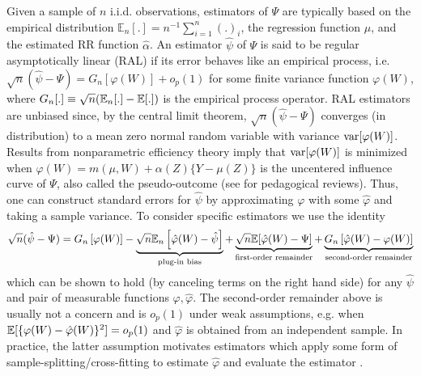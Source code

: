 Given a sample of $n$ i.i.d. observations, estimators of $\Psi$ are typically based on the empirical distribution $\mathbb{E}_n[.] = n^{-1}\sum_{i=1}^n (.)_i$, the regression function $\hat{\mu}$, and the estimated RR function $\hat{\alpha}$. An estimator $\hat{\psi}$ of $\Psi$ is said to be regular asymptotically linear (RAL) if its error behaves like an empirical process, i.e. $\sqrt{n}(\hat{\psi} - \Psi)= G_n[\varphi(W)] + o_p(1)$ for some finite variance function $\varphi(W)$, where $G_n[.] \equiv \sqrt{n} (\mathbb{E}_n[.]- \mathbb{E}[.])$ is the empirical process operator. RAL estimators are unbiased since, by the central limit theorem, $\sqrt{n}(\hat{\psi} - \Psi)$ converges (in distribution) to a mean zero normal random variable with variance $\mathrm{var}[\varphi(W)]$. Results from nonparametric efficiency theory \citep{Newey1994} imply that $\mathrm{var}[\varphi(W)]$ is minimized when $\varphi(W) = m(\mu, W) + \alpha(Z)\{Y - \mu(Z)\}$ is the uncentered influence curve \citep{Hampel1974,Ichimura2022} of $\Psi$, also called the pseudo-outcome \citep{Kennedy2020, Hines2023b} (see \cite{Hines2022, Kennedy2022} for pedagogical reviews). Thus, one can construct standard errors for $\hat{\psi}$ by approximating $\varphi$ with some $\hat{\varphi}$ and taking a sample variance. To consider specific estimators we use the identity
\begin{align}
    \sqrt{n}(\hat{\psi} - \Psi) = G_n \left[\varphi(W) \right] - \underbrace{\sqrt{n}\mathbb{E}_n \left[\hat{\varphi}(W) - \hat{\psi} \right]}_{\text{plug-in bias}} + \underbrace{\sqrt{n}\mathbb{E}[\hat{\varphi}(W) - \Psi]}_{\text{first-order remainder}} +  \underbrace{ G_n \left[\hat{\varphi}(W) - \varphi(W) \right] }_{\text{second-order remainder}} \label{von_miesz}
\end{align}
which can be shown to hold (by canceling terms on the right hand side) for any $\hat{\psi}$ and pair of measurable functions $\varphi, \hat{\varphi}$. The second-order remainder above is usually not a concern and is $o_p(1)$ under weak assumptions, e.g. when $\mathbb{E}[\{\varphi(W) - \hat{\varphi}(W)\}^2] = o_p(1)$ and $\hat{\varphi}$ is obtained from an independent sample. In practice, the latter assumption motivates estimators which apply some form of sample-splitting/cross-fitting to estimate $\hat{\varphi}$ and evaluate the estimator \citep{van_der_laan_cross-validated_2011,Chernozhukov2018}.

